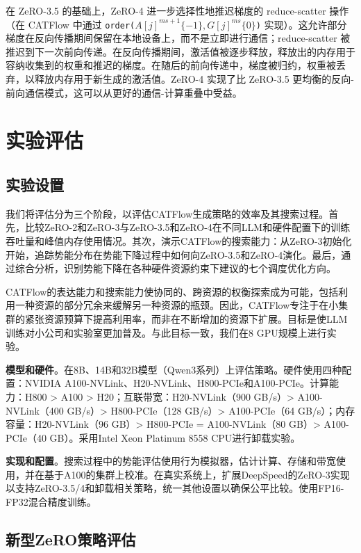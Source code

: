 在 ZeRO-3.5 的基础上，ZeRO-4 进一步选择性地推迟梯度的 reduce-scatter 操作（在 CATFlow 中通过 \texttt{order($A[j]^{ms+1}\{-1\}, G[j]^{ms}\{0\}$)} 实现）。这允许部分梯度在反向传播期间保留在本地设备上，而不是立即进行通信；reduce-scatter 被推迟到下一次前向传递。在反向传播期间，激活值被逐步释放，释放出的内存用于容纳收集到的权重和推迟的梯度。在随后的前向传递中，梯度被归约，权重被丢弃，以释放内存用于新生成的激活值。ZeRO-4 实现了比 ZeRO-3.5 更均衡的反向-前向通信模式，这可以从更好的通信-计算重叠中受益。

\section{实验评估}

\subsection{实验设置}

我们将评估分为三个阶段，以评估CATFlow生成策略的效率及其搜索过程。首先，比较ZeRO-2和ZeRO-3与ZeRO-3.5和ZeRO-4在不同LLM和硬件配置下的训练吞吐量和峰值内存使用情况。其次，演示CATFlow的搜索能力：从ZeRO-3初始化开始，追踪势能分布在势能下降过程中如何向ZeRO-3.5和ZeRO-4演化。最后，通过综合分析，识别势能下降在各种硬件资源约束下建议的七个调度优化方向。

CATFlow的表达能力和搜索能力使协同的、跨资源的权衡探索成为可能，包括利用一种资源的部分冗余来缓解另一种资源的瓶颈。因此，CATFlow专注于在小集群的紧张资源预算下提高利用率，而非在不断增加的资源下扩展。目标是使LLM训练对小公司和实验室更加普及。与此目标一致，我们在8 GPU规模上进行实验。

\textbf{模型和硬件}。在8B、14B和32B模型（Qwen3系列）上评估策略。硬件使用四种配置：NVIDIA A100-NVLink、H20-NVLink、H800-PCIe和A100-PCIe。计算能力：H800 > A100 > H20；互联带宽：H20-NVLink（900 GB/s）> A100-NVLink（400 GB/s）> H800-PCIe（128 GB/s）> A100-PCIe（64 GB/s）；内存容量：H20-NVLink（96 GB）> H800-PCIe = A100-NVLink（80 GB）> A100-PCIe（40 GB）。采用Intel Xeon Platinum 8558 CPU进行卸载实验。

\textbf{实现和配置}。搜索过程中的势能评估使用行为模拟器，估计计算、存储和带宽使用，并在基于A100的集群上校准。在真实系统上，扩展DeepSpeed的ZeRO-3实现以支持ZeRO-3.5/4和卸载相关策略，统一其他设置以确保公平比较。使用FP16-FP32混合精度训练。

\subsection{新型ZeRO策略评估}

